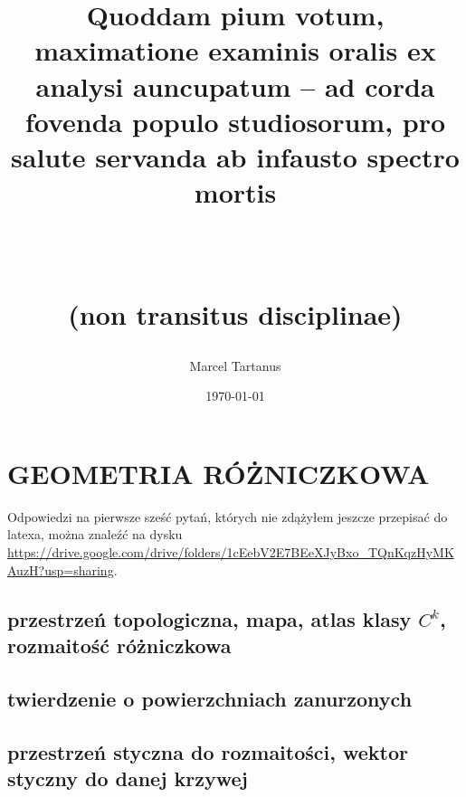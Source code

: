 \documentclass{article}
\title{\begin{Huge}Quoddam pium votum, maximatione examinis oralis ex analysi auncupatum – ad corda fovenda populo studiosorum, pro salute servanda ab infausto spectro mortis\end{Huge} \\ \begin{LARGE} (non transitus disciplinae) \end{LARGE}}
\author{Marcel Tartanus}
\date{\today}
\begin{document}
\maketitle

\section*{\centering GEOMETRIA RÓŻNICZKOWA}

Odpowiedzi na pierwsze sześć pytań, których nie zdążyłem jeszcze przepisać do latexa, można znaleźć na dysku \url{https://drive.google.com/drive/folders/1cEebV2E7BEeXJyBxo_TQnKqzHyMKAuzH?usp=sharing}.

\subsection{przestrzeń topologiczna, mapa, atlas klasy \texorpdfstring{$C^k$}{TEXT}, rozmaitość różniczkowa}










\subsection{twierdzenie o powierzchniach zanurzonych}

\subsection{przestrzeń styczna do rozmaitości, wektor styczny do danej krzywej}
\end{document}
